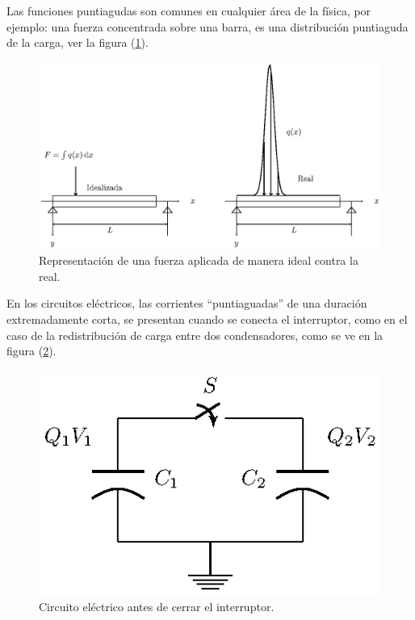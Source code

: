 Las funciones puntiagudas son comunes en cualquier área de la física, por ejemplo: una fuerza concentrada sobre una barra, es una distribución puntiaguda de la carga, ver la figura (\ref{fig:figura_delta_Dirac_02}). 
\begin{figure}[H]
    \centering
    \includegraphics[scale=1]{Imagenes/delta_Dirac_02.eps}
    \caption{Representación de una fuerza aplicada de manera ideal contra la real.}
    \label{fig:figura_delta_Dirac_02}
\end{figure}

En los circuitos eléctricos, las corrientes \enquote{puntiaguadas} de una duración extremadamente corta, se presentan cuando se conecta el interruptor, como en el caso de la redistribución de carga entre dos condensadores, como se ve en la figura (\ref{fig_figura_delta_Dirac_03}).
\begin{figure}[H]
    \centering
    \includegraphics[scale=1.4]{Imagenes/delta_Dirac_03.eps}
    \caption{Circuito eléctrico antes de cerrar el interruptor.}
    \label{fig_figura_delta_Dirac_03}
\end{figure}

